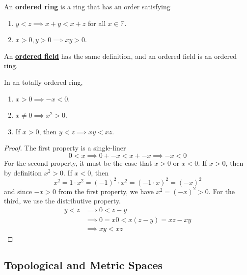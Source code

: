   \begin{definition}
    \label{def:ordered-ring-field}
    An \textbf{ordered ring} is a ring that has an order satisfying 
    \begin{enumerate}
      \item $y < z \implies x + y < x + z$ for all $x \in \mathbb{F}$. 
      \item $x > 0, y > 0 \implies xy > 0$. 
    \end{enumerate}
    An \textbf{\hyperref[alg-def:ordered-field]{ordered field}} has the same definition, and an ordered field is an ordered ring. 
  \end{definition}

  \begin{theorem}[Properties]
    \label{thm:properties}
    In an totally ordered ring, 
    \begin{enumerate}
      \item $x > 0 \implies -x < 0$. 
      \item $x \neq 0 \implies x^2 > 0$. 
      \item If $x > 0$, then $y < z \implies xy < xz$. 
    \end{enumerate}
  \end{theorem} 
  \begin{proof}
    The first property is a single-liner 
    \begin{equation}
      0 < x \implies 0 + -x < x + -x \implies -x < 0 
    \end{equation}
    For the second property, it must be the case that $x > 0$ or $x < 0$. If $x > 0$, then by definition $x^2 > 0$. If $x < 0$, then 
    \begin{equation}
      x^2 = 1 \cdot x^2 = (-1)^2 \cdot x^2 = (-1 \cdot x)^2 = (-x)^2
    \end{equation}
    and since $-x > 0$ from the first property, we have $x^2 = (-x)^2 > 0$. For the third, we use the distributive property. 
    \begin{align}
      y < z & \implies 0 < z - y \\ 
            & \implies 0 = x 0 < x(z - y) = xz - xy \\
            & \implies xy < xz
    \end{align}
  \end{proof}

\subsection{Topological and Metric Spaces} 

